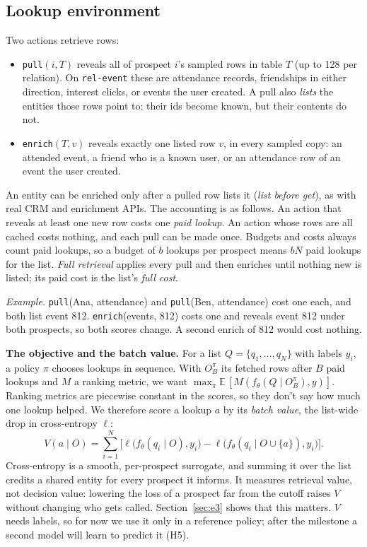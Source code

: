 \documentclass{article}
\begin{document}
\subsection{Lookup environment}
\label{sec:env}
Two actions retrieve rows:
\begin{itemize}
  \setlength\itemsep{0pt}
  \item \texttt{pull}$(i, T)$ reveals all of prospect $i$'s sampled rows in table $T$ (up to 128 per relation). On \texttt{rel-event} these are attendance records, friendships in either direction, interest clicks, or events the user created. A pull also \emph{lists} the entities those rows point to: their ids become known, but their contents do not.
  \item \texttt{enrich}$(T, v)$ reveals exactly one listed row $v$, in every sampled copy: an attended event, a friend who is a known user, or an attendance row of an event the user created.
\end{itemize}
An entity can be enriched only after a pulled row lists it (\emph{list before get}), as with real CRM and enrichment APIs. The accounting is as follows. An action that reveals at least one new row costs one \emph{paid lookup}. An action whose rows are all cached costs nothing, and each pull can be made once. Budgets and costs always count paid lookups, so a budget of $b$ lookups per prospect means $bN$ paid lookups for the list. \emph{Full retrieval} applies every pull and then enriches until nothing new is listed; its paid cost is the list's \emph{full cost}.

\emph{Example.} \texttt{pull}(Ana, attendance) and \texttt{pull}(Ben, attendance) cost one each, and both list event 812. \texttt{enrich}(events, 812) costs one and reveals event 812 under both prospects, so both scores change. A second enrich of 812 would cost nothing.

\textbf{The objective and the batch value.} For a list $Q = \{q_1, \dots, q_N\}$ with labels $y_i$, a policy $\pi$ chooses lookups in sequence. With $O^\pi_B$ its fetched rows after $B$ paid lookups and $M$ a ranking metric, we want $\max_\pi \mathbb{E}\,[M(f_\theta(Q \mid O^\pi_B), y)]$. Ranking metrics are piecewise constant in the scores, so they don't say how much one lookup helped. We therefore score a lookup $a$ by its \emph{batch value}, the list-wide drop in cross-entropy $\ell$:
\begin{equation}
  V(a \mid O) = \textstyle\sum_{i=1}^{N} \big[ \ell\big(f_\theta(q_i \mid O), y_i\big) - \ell\big(f_\theta(q_i \mid O \cup \{a\}), y_i\big) \big].
  \label{eq:value}
\end{equation}
Cross-entropy is a smooth, per-prospect surrogate, and summing it over the list credits a shared entity for every prospect it informs. It measures retrieval value, not decision value: lowering the loss of a prospect far from the cutoff raises $V$ without changing who gets called. Section~\ref{sec:e3} shows that this matters. $V$ needs labels, so for now we use it only in a reference policy; after the milestone a second model will learn to predict it (H5).
\end{document}
